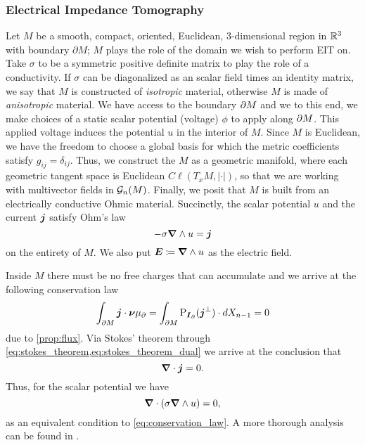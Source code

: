 \subsubsection{Electrical Impedance Tomography}
Let $M$ be a smooth, compact, oriented, Euclidean, 3-dimensional region in $\mathbb{R}^3$ with boundary $\partial M$; $M$ plays the role of the domain we wish to perform EIT on. Take $\sigma$ to be a symmetric positive definite matrix to play the role of a conductivity. If $\sigma$ can be diagonalized as an scalar field times an identity matrix, we say that $M$ is constructed of \emph{isotropic} material, otherwise $M$ is made of \emph{anisotropic} material. We have access to the boundary ${\partial M}$ and we to this end, we make choices of a static scalar potential (voltage) $\phi$ to apply along ${\partial M}$. This applied voltage induces the potential $u$ in the interior of $M$. Since $M$ is Euclidean, we have the freedom to choose a global basis for which the metric coefficients satisfy $g_{ij}=\delta_{ij}$. Thus, we construct the $M$ as a geometric manifold, where each geometric tangent space is Euclidean $C\ell(T_xM, |\cdot|)$, so that we are working with multivector fields in $\mathcal{G}_n(M)$. Finally, we posit that $M$ is built from an electrically conductive Ohmic material. Succinctly, the scalar potential $u$ and the current $\boldsymbol{j}$ satisfy Ohm's law 
\begin{equation}
\label{eq:ohms_law}
-\sigma \boldsymbol{\nabla} \wedge u= \boldsymbol{j}
\end{equation}
on the entirety of $M$. We also put $\boldsymbol{E}\coloneqq \boldsymbol{\nabla} \wedge u$ as the electric field. 

Inside $M$ there must be no free charges that can accumulate and we arrive at the following conservation law
\begin{equation}
\label{eq:conservation_law}
\int_{{\partial M}} \boldsymbol{j} \cdot \boldsymbol{\nu} \mu_\partial = \int_{{\partial M}} \operatorname{P}_{\boldsymbol{I}_\partial}(\boldsymbol{j}^\perp) \cdot dX_{n-1} = 0
\end{equation}
due to \cref{prop:flux}. Via Stokes' theorem through \cref{eq:stokes_theorem,eq:stokes_theorem_dual} we arrive at the conclusion that 
\begin{equation}
\boldsymbol{\nabla} \cdot \boldsymbol{j}= 0.
\end{equation}
Thus, for the scalar potential we have
\begin{equation}
\boldsymbol{\nabla} \cdot (\sigma \boldsymbol{\nabla} \wedge u) = 0,
\end{equation} 
as an equivalent condition to \cref{eq:conservation_law}. A more thorough analysis can be found in \cite{feldman_calderproblem_nodate}. 

